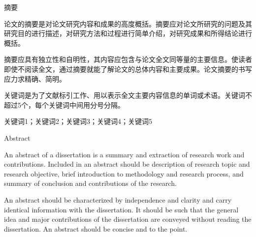 \documentclass[12pt,a4paper]{ctexart}
\begin{document}
\newpage
\clearpage
{} %
\setcounter{page}{2} %

\vspace*{0pt} %
\begin{center}
    \heiti {} 摘\hspace{1em}要 %
\end{center}
\vspace{0.1cm} %

 \songti 
\noindent\hspace{2em}论文的摘要是对论文研究内容和成果的高度概括。摘要应对论文所研究的问题及其研究目的进行描述，对研究方法和过程进行简单介绍，对研究成果和所得结论进行概括。
    
\noindent\hspace{2em}摘要应具有独立性和自明性，其内容应包含与论文全文同等量的主要信息。使读者即使不阅读全文，通过摘要就能了解论文的总体内容和主要成果。论文摘要的书写应力求精确、简明。
    
\noindent\hspace{2em}关键词是为了文献标引工作、用以表示全文主要内容信息的单词或术语。关键词不超过5个，每个关键词中间用分号分隔。
    
\vspace{1em}
\songti 关键词1；关键词2；关键词3；关键词4；关键词5

\newpage
\enlargethispage{\baselineskip} %
\vspace*{-\topskip} %
\begin{center}
    \heiti {} Abstract
\end{center}
\vspace{0.1cm}

\selectfont %
\noindent\hspace{2em}An abstract of a dissertation is a summary and extraction of research work and contributions. Included in an abstract should be description of research topic and research objective, brief introduction to methodology and research process, and summary of conclusion and contributions of the research.

\noindent\hspace{2em}An abstract should be characterized by independence and clarity and carry identical information with the dissertation. It should be such that the general idea and major contributions of the dissertation are conveyed without reading the dissertation. An abstract should be concise and to the point.
\end{document}
